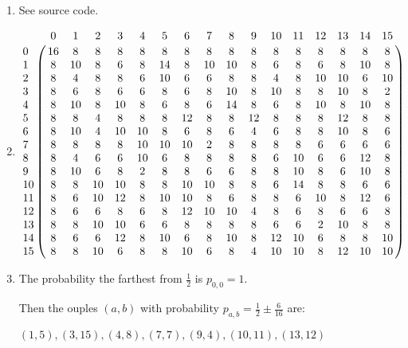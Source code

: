 








\begin{enumerate}[label=\textbf{\arabic*})]
    \setlength\itemsep{2em}
    \item See source code.

    \item
        \[
        \bordermatrix{
        & 0 & 1 & 2 & 3 & 4 & 5 & 6 & 7 & 8 & 9 & 10 & 11 & 12 & 13 & 14 & 15\cr
        0 & 16 & 8 & 8 & 8 & 8 & 8 & 8 & 8 & 8 & 8 & 8 & 8 & 8 & 8 & 8 & 8\cr
        1 & 8 & 10 & 8 & 6 & 8 & 14 & 8 & 10 & 10 & 8 & 6 & 8 & 6 & 8 & 10 & 8\cr
        2 & 8 & 4 & 8 & 8 & 6 & 10 & 6 & 6 & 8 & 8 & 4 & 8 & 10 & 10 & 6 & 10\cr
        3 & 8 & 6 & 8 & 6 & 6 & 8 & 6 & 8 & 10 & 8 & 10 & 8 & 8 & 10 & 8 & 2\cr
        4 & 8 & 10 & 8 & 10 & 8 & 6 & 8 & 6 & 14 & 8 & 6 & 8 & 10 & 8 & 10 & 8\cr
        5 & 8 & 8 & 4 & 8 & 8 & 8 & 12 & 8 & 8 & 12 & 8 & 8 & 8 & 12 & 8 & 8\cr
        6 & 8 & 10 & 4 & 10 & 10 & 8 & 6 & 8 & 6 & 4 & 6 & 8 & 8 & 10 & 8 & 6\cr
        7 & 8 & 8 & 8 & 8 & 10 & 10 & 10 & 2 & 8 & 8 & 8 & 8 & 6 & 6 & 6 & 6\cr
        8 & 8 & 4 & 6 & 6 & 10 & 6 & 8 & 8 & 8 & 8 & 6 & 10 & 6 & 6 & 12 & 8\cr
        9 & 8 & 10 & 6 & 8 & 2 & 8 & 8 & 6 & 6 & 8 & 8 & 10 & 8 & 6 & 10 & 8\cr
        10 & 8 & 8 & 10 & 10 & 8 & 8 & 10 & 10 & 8 & 8 & 6 & 14 & 8 & 8 & 6 & 6\cr
        11 & 8 & 6 & 10 & 12 & 8 & 10 & 10 & 8 & 6 & 8 & 8 & 6 & 10 & 8 & 12 & 6\cr
        12 & 8 & 6 & 6 & 8 & 6 & 8 & 12 & 10 & 10 & 4 & 8 & 6 & 8 & 6 & 6 & 8\cr
        13 & 8 & 8 & 10 & 10 & 6 & 6 & 8 & 8 & 8 & 8 & 6 & 6 & 2 & 10 & 8 & 8\cr
        14 & 8 & 6 & 6 & 12 & 8 & 10 & 6 & 8 & 10 & 8 & 12 & 10 & 6 & 8 & 8 & 10\cr
        15 & 8 & 8 & 10 & 6 & 8 & 8 & 10 & 6 & 8 & 4 & 10 & 10 & 8 & 12 & 10 & 10\cr
        }
        \]
    \item
    The probability the farthest from $\frac{1}{2}$ is $p_{0, 0} = 1$.

    Then the ouples $(a, b)$ with probability $p_{a, b} = \frac{1}{2} \pm \frac{6}{16}$ are:

    $(1, 5), (3, 15), (4, 8), (7, 7), (9, 4), (10, 11), (13, 12)$


\end{enumerate}
